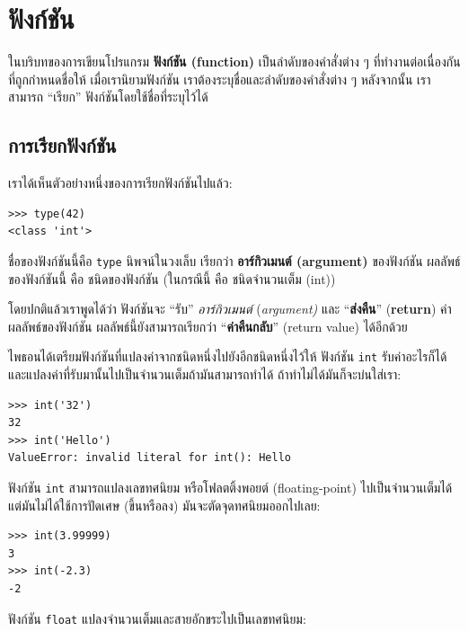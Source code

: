 \chapter{ฟังก์ชัน } %
\label{funcchap}


ในบริบทของการเขียนโปรแกรม {\bf ฟังก์ชัน (function)} เป็นลำดับของคำสั่งต่าง ๆ 
ที่ทำงานต่อเนื่องกันที่ถูกกำหนดชื่อให้  เมื่อเรานิยามฟังก์ชัน เราต้องระบุชื่อและลำดับของคำสั่งต่าง ๆ 
หลังจากนั้น เราสามารถ ``เรียก'' ฟังก์ชันโดยใช้ชื่อที่ระบุไว้ได้

\section{การเรียกฟังก์ชัน} %
\label{functionchap}

เราได้เห็นตัวอย่างหนึ่งของการเรียกฟังก์ชันไปแล้ว:

\begin{verbatim}
>>> type(42)
<class 'int'>
\end{verbatim}
%
ชื่อของฟังก์ชันนี้คือ {\tt type} นิพจน์ในวงเล็บ เรียกว่า {\bf อาร์กิวเมนต์ (argument)} ของฟังก์ชัน
ผลลัพธ์ของฟังก์ชันนี้ คือ ชนิดของฟังก์ชัน (ในกรณีนี้ คือ ชนิดจำนวนเต็ม (int))  

โดยปกติแล้วเราพูดได้ว่า ฟังก์ชันจะ ``รับ'' \textit{อาร์กิวเมนต์} (\textit{argument)} และ ``\textbf{ส่งคืน}'' (\textbf{return}) ค่าผลลัพธ์ของฟังก์ชัน
ผลลัพธ์นี้ยังสามารถเรียกว่า ``\textbf{ค่าคืนกลับ}'' (return value) ได้อีกด้วย 

ไพธอนได้เตรียมฟังก์ชันที่แปลงค่าจากชนิดหนึ่งไปยังอีกชนิดหนึ่งไว้ให้ ฟังก์ชัน {\tt int} รับค่าอะไรก็ได้
และแปลงค่าที่รับมานั้นไปเป็นจำนวนเต็มถ้ามันสามารถทำได้ ถ้าทำไม่ได้มันก็จะบ่นใส่เรา: 

\begin{verbatim}
>>> int('32')
32
>>> int('Hello')
ValueError: invalid literal for int(): Hello
\end{verbatim}
%
ฟังก์ชัน {\tt int} สามารถแปลงเลขทศนิยม หรือโฟลตติ้งพอยต์ (floating-point) ไปเป็นจำนวนเต็มได้
แต่มันไม่ได้ใช้การปัดเศษ (ขึ้นหรือลง) มันจะตัดจุดทศนิยมออกไปเลย: 

\begin{verbatim}
>>> int(3.99999)
3
>>> int(-2.3)
-2
\end{verbatim}
%
ฟังก์ชัน {\tt float} แปลงจำนวนเต็มและสายอักขระไปเป็นเลขทศนิยม:


